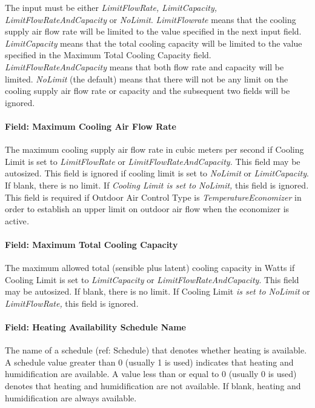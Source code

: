 The input must be either \emph{LimitFlowRate, LimitCapacity, LimitFlowRateAndCapacity} or \emph{NoLimit}. \emph{LimitFlowrate} means that the cooling supply air flow rate will be limited to the value specified in the next input field. \emph{LimitCapacity} means that the total cooling capacity will be limited to the value specified in the Maximum Total Cooling Capacity field. \emph{LimitFlowRateAndCapacity} means that both flow rate and capacity will be limited. \emph{NoLimit} (the default) means that there will not be any limit on the cooling supply air flow rate or capacity and the subsequent two fields will be ignored.

\paragraph{Field: Maximum Cooling Air Flow Rate}\label{field-maximum-cooling-air-flow-rate-000}

The maximum cooling supply air flow rate in cubic meters per second if Cooling Limit is set to \emph{LimitFlowRate} or \emph{LimitFlowRateAndCapacity.} This field may be autosized. This field is ignored if cooling limit is set to \emph{NoLimit} or \emph{LimitCapacity}. If blank, there is no limit. If \emph{Cooling Limit is set to NoLimit,} this field is ignored\emph{.} This field is required if Outdoor Air Control Type is \emph{TemperatureEconomizer} in order to establish an upper limit on outdoor air flow when the economizer is active\emph{.}

\paragraph{Field: Maximum Total Cooling Capacity}\label{field-maximum-total-cooling-capacity}

The maximum allowed total (sensible plus latent) cooling capacity in Watts if Cooling Limit is set to \emph{LimitCapacity} or \emph{LimitFlowRateAndCapacity}. This field may be autosized. If blank, there is no limit. If Cooling Limit \emph{is set to NoLimit} or \emph{LimitFlowRate,} this field is ignored\emph{.}

\paragraph{Field: Heating Availability Schedule Name}\label{field-heating-availability-schedule-name-000}

The name of a schedule (ref: Schedule) that denotes whether heating is available. A schedule value greater than 0 (usually 1 is used) indicates that heating and humidification are available. A value less than or equal to 0 (usually 0 is used) denotes that heating and humidification are not available. If blank, heating and humidification are always available.

